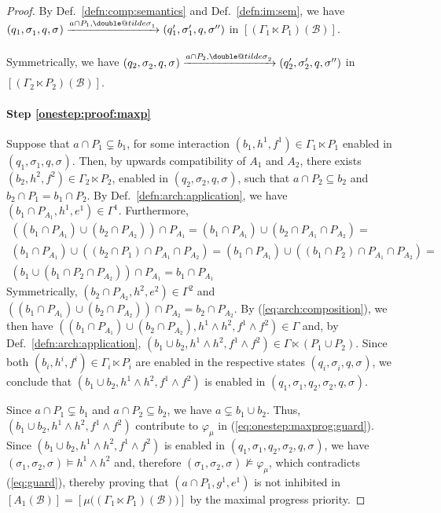 \documentclass{llncs}
\makeatletter
\newcommand{\defn}[1]{Def.~\ref{defn:#1}}
\newcommand{\eq}[1]{(\ref{eq:#1})}
\newcommand{\cB}{\ensuremath{\mathcal{B}}}
\newcommand{\goesto}[2][]{\ensuremath{\xrightarrow[{#1}\relax]{#2}}}
\newcommand{\val}[3][]{\ensuremath{#1{\sigma}^{#2}_{#3}}}
\newcommand{\primeit}[1]{#1'}
\newcommand{\secondit}[1]{#1''}
\newcommand{\semopen}[1]{\ensuremath{[{#1}]}}
\newcommand{\IMextend}[2]{\ensuremath{#1 \ltimes #2}}
\newcommand{\expmix}{\wedge}
\newcommand{\doubletilde}[1]{{%
  \mathpalette\double@tilde{#1}%
}}
\newcommand{\double@tilde}[2]{%
  \sbox\z@{$\m@th#1\tilde{#2}$}%
  \ht\z@=.9\ht\z@
  \tilde{\box\z@}%
}
\makeatother
\begin{document}
\begin{proof}
  By \defn{comp:semantics} and \defn{im:sem}, we have
  $
  (q_1, \val{}{1}, q, \val{}{})
  \goesto{a \cap P_1, \val[\doubletilde]{}{1}}
  (q_1', \val[\primeit]{}{1}, q, \val[\secondit]{}{})
  $ in $\semopen{(\IMextend{\Gamma_1}{P_1})(\cB)}$.

  Symmetrically, we have 
  $
  (q_2, \val{}{2}, q, \val{}{})
  \goesto{a \cap P_2, \val[\doubletilde]{}{2}}
  (q_2', \val[\primeit]{}{2}, q, \val[\secondit]{}{})
  $ in $\semopen{(\IMextend{\Gamma_2}{P_2})(\cB)}$.   
   
  \paragraph*{Step \ref{onestep:proof:maxp}}
  Suppose that $a \cap P_1 \varsubsetneq b_1$, for some interaction
  $(b_1, h^1, f^1) \in \IMextend{\Gamma_1}{P_1}$ enabled in $(q_1,
  \val{}{1}, q, \val{}{})$.  Then, by upwards compatibility of $A_1$
  and $A_2$, there exists $(b_2, h^2, f^2) \in
  \IMextend{\Gamma_2}{P_2}$, enabled in $(q_2, \val{}{2}, q,
  \val{}{})$, such that $a \cap P_2 \subseteq b_2$ and $b_2 \cap P_1 =
  b_1 \cap P_2$.  By \defn{arch:application}, we have $(b_1 \cap P_{A_1},
  h^1, e^1) \in \Gamma^1$.  Furthermore,
%
  \begin{multline*}
    ((b_1 \cap P_{A_1}) \cup (b_2 \cap P_{A_2}))  \cap P_{A_1} =
    (b_1 \cap P_{A_1}) \cup (b_2 \cap P_{A_1} \cap P_{A_2}) =\\
    (b_1 \cap P_{A_1}) \cup ((b_2 \cap P_1) \cap P_{A_1} \cap P_{A_2}) =  
    (b_1 \cap P_{A_1}) \cup ((b_1 \cap P_2) \cap P_{A_1} \cap P_{A_2}) =\\
    (b_1 \cup (b_1 \cap P_2 \cap P_{A_2})) \cap P_{A_1} =
    b_1 \cap P_{A_1} 
  \end{multline*}
%
  Symmetrically, $(b_2 \cap P_{A_2}, h^2, e^2) \in \Gamma^2$ and
  $((b_1 \cap P_{A_1}) \cup (b_2 \cap P_{A_2})) \cap P_{A_2} = b_2
  \cap P_{A_2}$.  By \eq{arch:composition}, we then have $((b_1 \cap
  P_{A_1}) \cup (b_2 \cap P_{A_2}), h^1 \land h^2, f^1 \expmix f^2)
  \in \Gamma$ and, by \defn{arch:application}, $(b_1 \cup b_2, h^1 \land
  h^2, f^1 \expmix f^2) \in \IMextend{\Gamma}{(P_1 \cup P_2)}$.
%
  Since both $(b_i, h^i, f^i) \in \IMextend{\Gamma_i}{P_i}$ are
  enabled in the respective states $(q_i, \val{}{i}, q, \val{}{})$, we
  conclude that $(b_1 \cup b_2, h^1 \land h^2, f^1 \expmix f^2)$ is
  enabled in $(q_1, \val{}{1}, q_2, \val{}{2}, q, \val{}{})$.

  Since $a \cap P_1 \varsubsetneq b_1$ and $a \cap P_2 \subseteq b_2$,
  we have $a \varsubsetneq b_1 \cup b_2$.  Thus, $(b_1 \cup b_2, h^1
  \land h^2, f^1 \expmix f^2)$ contribute to $\varphi_\mu$ in
  \eq{onestep:maxprog:guard}.  Since $(b_1 \cup b_2, h^1 \land h^2,
  f^1 \expmix f^2)$ is enabled in $(q_1, \val{}{1}, q_2, \val{}{2}, q,
  \val{}{})$, we have $(\val{}{1}, \val{}{2}, \val{}{}) \models h^1
  \land h^2$ and, therefore $(\val{}{1}, \val{}{2}, \val{}{})
  \not\models \varphi_\mu$, which contradicts \eq{guard}, thereby
  proving that $(a \cap P_1, g^1, e^1)$ is not inhibited in
  $\semopen{A_1(\cB)} =
  \semopen{\mu\bigl((\IMextend{\Gamma_1}{P_1})(\cB)\bigr)}$ by the
  maximal progress priority.


\end{proof}
\end{document}
